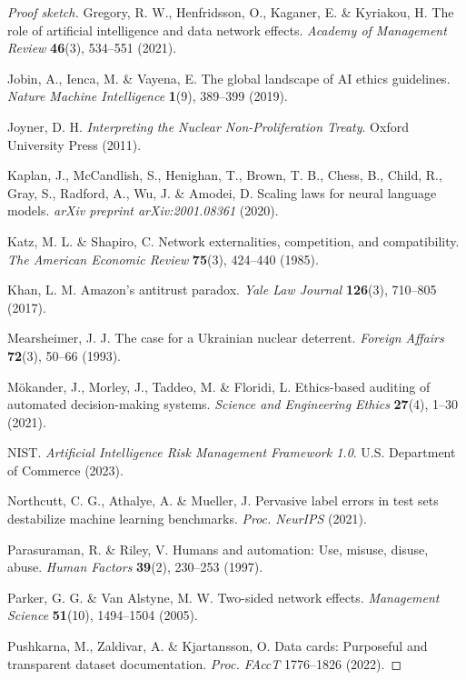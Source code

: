 \documentclass[12pt,a4paper]{ctexart}
\theoremstyle{definition}
\theoremstyle{remark}
\begin{document}
\begin{proof}[Proof sketch]
 Gregory, R. W., Henfridsson, O., Kaganer, E. \& Kyriakou, H. The role of artificial intelligence and data network effects. \textit{Academy of Management Review} \textbf{46}(3), 534--551 (2021).

 Jobin, A., Ienca, M. \& Vayena, E. The global landscape of AI ethics guidelines. \textit{Nature Machine Intelligence} \textbf{1}(9), 389--399 (2019).

 Joyner, D. H. \textit{Interpreting the Nuclear Non-Proliferation Treaty}. Oxford University Press (2011).

 Kaplan, J., McCandlish, S., Henighan, T., Brown, T. B., Chess, B., Child, R., Gray, S., Radford, A., Wu, J. \& Amodei, D. Scaling laws for neural language models. \textit{arXiv preprint arXiv:2001.08361} (2020).

 Katz, M. L. \& Shapiro, C. Network externalities, competition, and compatibility. \textit{The American Economic Review} \textbf{75}(3), 424--440 (1985).

 Khan, L. M. Amazon's antitrust paradox. \textit{Yale Law Journal} \textbf{126}(3), 710--805 (2017).

 Mearsheimer, J. J. The case for a Ukrainian nuclear deterrent. \textit{Foreign Affairs} \textbf{72}(3), 50--66 (1993).

 M\"{o}kander, J., Morley, J., Taddeo, M. \& Floridi, L. Ethics-based auditing of automated decision-making systems. \textit{Science and Engineering Ethics} \textbf{27}(4), 1--30 (2021).

 NIST. \textit{Artificial Intelligence Risk Management Framework 1.0}. U.S. Department of Commerce (2023).

 Northcutt, C. G., Athalye, A. \& Mueller, J. Pervasive label errors in test sets destabilize machine learning benchmarks. \textit{Proc. NeurIPS} (2021).

 Parasuraman, R. \& Riley, V. Humans and automation: Use, misuse, disuse, abuse. \textit{Human Factors} \textbf{39}(2), 230--253 (1997).

 Parker, G. G. \& Van Alstyne, M. W. Two-sided network effects. \textit{Management Science} \textbf{51}(10), 1494--1504 (2005).

 Pushkarna, M., Zaldivar, A. \& Kjartansson, O. Data cards: Purposeful and transparent dataset documentation. \textit{Proc. FAccT} 1776--1826 (2022).


\end{proof}
\end{document}
